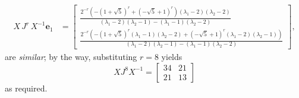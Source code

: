 \begin{example}
\begin{displaymath}
\begin{split}
X\,J^{r}\,X^{-1}\boldsymbol{e}_{1}  &= \left[\begin{matrix}\frac{2^{- r} \left(- \left(1 + \sqrt{5}\right)^{r} + \left(- \sqrt{5} + 1\right)^{r}\right) \left(\lambda_{1} - 2\right) \left(\lambda_{2} - 2\right)}{\left(\lambda_{1} - 2\right) \left(\lambda_{2} - 1\right) - \left(\lambda_{1} - 1\right) \left(\lambda_{2} - 2\right)}\\\frac{2^{- r} \left(- \left(1 + \sqrt{5}\right)^{r} \left(\lambda_{1} - 1\right) \left(\lambda_{2} - 2\right) + \left(- \sqrt{5} + 1\right)^{r} \left(\lambda_{1} - 2\right) \left(\lambda_{2} - 1\right)\right)}{\left(\lambda_{1} - 2\right) \left(\lambda_{2} - 1\right) - \left(\lambda_{1} - 1\right) \left(\lambda_{2} - 2\right)}\end{matrix}\right],
\end{split}
\end{displaymath}
are \textit{similar}; by the way, substituting $r=8$ yields
\begin{displaymath}
X J^{8} X^{-1} = \left[\begin{matrix}34 & 21\\21 & 13\end{matrix}\right]
\end{displaymath}
as required.
\end{example}
